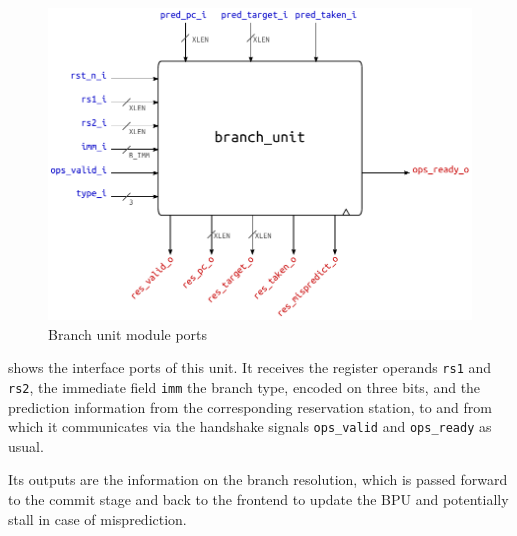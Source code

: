 \begin{figure}[hbt]
  \centering
  \includegraphics[width=.9\textwidth]{img/branch_unit-top.pdf}
  \caption{Branch unit module ports}
  \label{fig:branch_unit-top}
\end{figure}
 shows the interface ports of this unit. It receives the register operands \texttt{rs1} and \texttt{rs2}, the immediate field \texttt{imm} the branch type, encoded on three bits, and the prediction information from the corresponding reservation station, to and from which it communicates via the handshake signals \texttt{ops\_valid} and \texttt{ops\_ready} as usual.

Its outputs are the information on the branch resolution, which is passed forward to the commit stage and back to the frontend to update the \ac{BPU} and potentially stall in case of misprediction.

